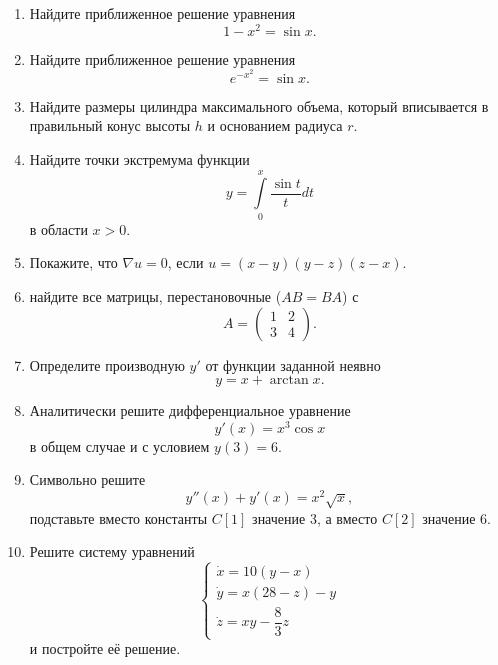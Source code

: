 \documentclass[preview]{standalone}
\begin{document}
\begin{enumerate}
	\item Найдите приближенное решение уравнения
	\[
	1-x^2 = \sin x.
	\]
	\item Найдите приближенное решение уравнения
	\[
	e^{-x^2}=\sin x.
	\]
	\item Найдите размеры цилиндра максимального объема, который вписывается в правильный конус высоты $h$ и основанием радиуса $r$.
	\item Найдите точки экстремума функции 
	\[
	y=\int\limits_{0}^x \dfrac{\sin t}{t} dt 
	\]
	в области $x>0$.
	\item Покажите, что $\nabla{u} = 0$, если $u = (x-y)(y-z)(z-x)$.
	\item найдите все матрицы, перестановочные ($AB=BA$) с 
	\[
	A=\begin{pmatrix}
		1 & 2 \\
		3 & 4
	\end{pmatrix}.
	\]  
	\item Определите производную $y'$ от функции заданной неявно
	\[
	y=x+\arctan{x}.
	\]
	\item Аналитически решите дифференциальное уравнение
	\[
	y'(x)=x^3\cos x
	\]
	в общем случае и с условием $y(3)=6$.
	\item Символьно решите 
	\[
	y''(x)+y'(x)=x^2\sqrt{x},
	\]
	подставьте вместо константы $C[1]$ значение 3, а вместо $C[2]$ значение 6.
	\item Решите систему уравнений 
	\[
	\begin{cases}
		\dot{x} = 10(y-x)\\
		\dot{y} = x(28-z) - y\\
		\dot{z} = x y - \dfrac{8}{3} z
	\end{cases}
	\]
	и постройте её решение.
	
\end{enumerate}
\end{document}

